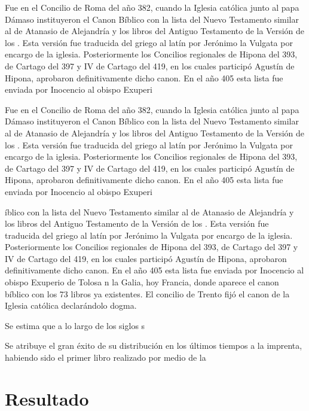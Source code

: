 \documentclass[a4paper,12pt]{article}
\begin{document}
Fue en el Concilio de Roma del año 382, cuando la Iglesia católica junto al papa Dámaso instituyeron el Canon Bíblico con la lista del Nuevo Testamento similar al de Atanasio de Alejandría y los libros del Antiguo Testamento de la Versión de los . Esta versión fue traducida del griego al latín por Jerónimo la Vulgata por encargo de la iglesia. Posteriormente los Concilios regionales de Hipona del 393,  de Cartago del 397 y IV de Cartago del 419, en los cuales participó Agustín de Hipona, aprobaron definitivamente dicho canon. En el año 405 esta lista fue enviada por Inocencio al obispo Exuperi

Fue en el Concilio de Roma del año 382, cuando la Iglesia católica junto al papa Dámaso instituyeron el Canon Bíblico con la lista del Nuevo Testamento similar al de Atanasio de Alejandría y los libros del Antiguo Testamento de la Versión de los . Esta versión fue traducida del griego al latín por Jerónimo la Vulgata por encargo de la iglesia. Posteriormente los Concilios regionales de Hipona del 393,  de Cartago del 397 y IV de Cartago del 419, en los cuales participó Agustín de Hipona, aprobaron definitivamente dicho canon. En el año 405 esta lista fue enviada por Inocencio al obispo Exuperi

íblico con la lista del Nuevo Testamento similar al de Atanasio de Alejandría y los libros del Antiguo Testamento de la Versión de los . Esta versión fue traducida del griego al latín por Jerónimo la Vulgata por encargo de la iglesia. Posteriormente los Concilios regionales de Hipona del 393,  de Cartago del 397 y IV de Cartago del 419, en los cuales participó Agustín de Hipona, aprobaron definitivamente dicho canon. En el año 405 esta lista fue enviada por Inocencio al obispo Exuperio de Tolosa n la Galia, hoy Francia, donde aparece el canon bíblico con los 73 libros ya existentes. El concilio de Trento fijó el canon de la Iglesia católica declarándolo dogma.

Se estima que a lo largo de los siglos s

Se atribuye el gran éxito de su distribución en los últimos tiempos a la imprenta, habiendo sido el primer libro realizado por medio de la

\section{Resultado}
\end{document}
